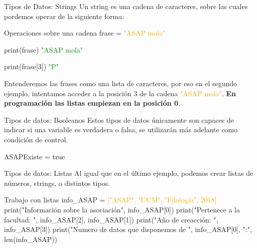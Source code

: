 \documentclass{beamer}
\begin{document}
    \begin{frame} {Tipos de Datos: Strings}
    \label{datos:strings}
    Un string es una cadena de caracteres, sobre las cuales pordemos operar de la siguiente forma:
    \begin{Programexample} {Operaciones sobre una cadena}
    	frase = \textcolor{orange}{"ASAP mola"}
    	
    	print(frase) \hspace{3cm} \textcolor{green}{"ASAP mola"}
    	
    	print(frase[3])\hspace{2.7cm} \textcolor{green}{"P"}
	\end{Programexample}

	Entenderemos las frases como una lista de caracteres, por eso en el segundo ejemplo, intentamos acceder a la posición 3 de la cadena  \textcolor{orange}{"ASAP mola"}.
	\textbf{En programación las listas empiezan en la posición 0}.
    \end{frame}
    \begin{frame}{Tipos de datos: Booleanos}
    Estos tipos de datos únicamente son capaces de indicar si una variable es verdadera o falsa, se utilizarán más adelante como condición de control.
    
    \begin{Programexample}
    	\centering ASAPExiste = true
    \end{Programexample}
	\end{frame}
    \begin{frame}{Tipos de datos: Listas}
    \label{datos:listas}
    Al igual que en el último ejemplo, podemos crear listas de números, strings, o distintos tipos.
    
    \begin{Programexample}{Trabajo con listas}
    	info\_ASAP = \textcolor{orange}{["ASAP", "UCM", "Filología", 2018]}
    	\newline\newline
    	print("Información sobre la asociación",  info\_ASAP[0])\newline
    	print("Pertenece a la facultad: ", info\_ASAP[2], info\_ASAP[1]) \newline
    	print("Año de creacción: ", info\_ASAP[3])\newline
    	print("Numero de datos que disponemos de ", info\_ASAP[0], ":", len(info\_ASAP))
    \end{Programexample}
    \end{frame}
\end{document}
